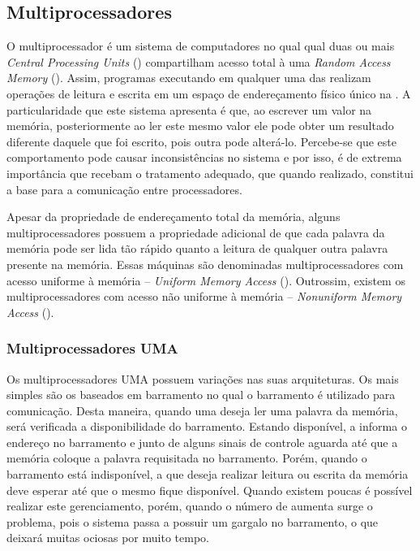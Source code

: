 \subsection{Multiprocessadores}
\label{subsec:multiprocessadores}

O multiprocessador é um sistema de computadores no qual qual duas ou mais \textit{Central Processing Units} (\cpus) compartilham acesso total à uma \textit{Random Access Memory} (\ram). Assim, programas executando em qualquer uma das \cpus realizam operações de leitura e escrita em um espaço de endereçamento físico único na \ram. A particularidade que este sistema apresenta é que, ao escrever um valor na memória, posteriormente ao ler este mesmo valor ele pode obter um resultado diferente daquele que foi escrito, pois outra \cpu pode alterá-lo. Percebe-se que este comportamento pode causar inconsistências no sistema e por isso, é de extrema importância que recebam o tratamento adequado, que quando realizado, constitui a base para a comunicação entre processadores.

Apesar da propriedade de endereçamento total da memória, alguns multiprocessadores possuem a propriedade adicional de que cada palavra da memória pode ser lida tão rápido quanto a leitura de qualquer outra palavra presente na memória. Essas máquinas são denominadas multiprocessadores com acesso uniforme à memória -- \textit{Uniform Memory Access} (\uma). Outrossim, existem os multiprocessadores com acesso não uniforme à memória -- \textit{Nonuniform Memory Access} (\numa).

\subsubsection{Multiprocessadores UMA}
\label{subsubsec:hw-multiprocessadores-uma}

Os multiprocessadores UMA possuem variações nas suas arquiteturas. Os mais simples são os baseados em barramento no qual o barramento é utilizado para comunicação. Desta maneira, quando uma \cpu deseja ler uma palavra da memória, será verificada a disponibilidade do barramento. Estando disponível, a \cpu informa o endereço no barramento e junto de alguns sinais de controle aguarda até que a memória coloque a palavra requisitada no barramento. Porém, quando o barramento está indisponível, a \cpu que deseja realizar leitura ou escrita da memória deve esperar até que o mesmo fique disponível. Quando existem poucas \cpus é possível realizar este gerenciamento, porém, quando o número de \cpus aumenta surge o problema, pois o sistema passa a possuir um gargalo no barramento, o que deixará muitas \cpus ociosas por muito tempo.

